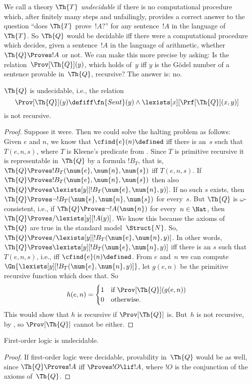 \documentclass[../../../include/open-logic-section]{subfiles}
\begin{document}

We call a theory $\Th{T}$ \emph{undecidable} if there is no
computational procedure which, after finitely many steps and
unfailingly, provides a correct answer to the question ``does $\Th{T}$
prove~$!A$?'' for any sentence~$!A$ in the language of~$\Th{T}$.  So
$\Th{Q}$ would be decidable iff there were a computational procedure
which decides, given a sentence~$!A$ in the language of arithmetic,
whether $\Th{Q} \Proves !A$ or not.  We can make this more precise by
asking: Is the relation~$\Prov[\Th{Q}](y)$, which holds of~$y$
iff $y$ is the G\"odel number of a sentence provable in~$\Th{Q}$,
recursive?  The answer is: no.

\begin{thm}
$\Th{Q}$ is undecidable, i.e., the relation
\[
\Prov[\Th{Q}](y) \defiff \fn{Sent}(y) \land
\lexists[x][\Prf[\Th{Q}](x, y)]
\]
is not recursive.
\end{thm}

\begin{proof}
Suppose it were.  Then we could solve the halting problem as follows:
Given $e$ and $n$, we know that $\cfind{e}(n) \defined$ iff there is
an~$s$ such that $T(e, n, s)$, where $T$ is Kleene's predicate from
.  Since $T$ is primitive recursive
it is representable in~$\Th{Q}$ by a formula $!B_T$, that is, $\Th{Q}
\Proves !B_T(\num{e}, \num{n}, \num{s})$ iff $T(e, n, s)$.  If $\Th{Q}
\Proves !B_T(\num{e}, \num{n}, \num{s})$ then also $ \Th{Q} \Proves
\lexists[y][!B_T(\num{e}, \num{n}, y)]$.  If no such $s$ exists, then
$\Th{Q} \Proves \lnot !B_T(\num{e}, \num{n}, \num{s})$ for
every~$s$.  But $\Th{Q}$ is $\omega$-consistent, i.e., if $\Th{Q}
\Proves \lnot !A(\num{n})$ for every~$n \in \Nat$, then $\Th{Q}
\Proves/ \lexists[y][!A(y)]$.  We know this because the axioms of
$\Th{Q}$ are true in the standard model~$\Struct{N}$.  So, $\Th{Q}
\Proves/ \lexists[y][!B_T(\num{e}, \num{n}, y)]$.  In other words,
$\Th{Q} \Proves \lexists[y][!B_T(\num{e}, \num{n}, y)]$ iff there is
an $s$ such that $T(e, n, s)$, i.e., iff $\cfind{e}(n) \defined$.
From $e$ and~$n$ we can compute $\Gn{\lexists[y][!B_T(\num{e},
    \num{n}, y)]}$, let $g(e, n)$ be the primitive recursive function
which does that.  So
\[
h(e, n) =
\begin{cases}
1 & \text{if $\Prov[\Th{Q}](g(e, n))$}\\
0 & \text{otherwise}.
\end{cases}
\]
This would show that $h$ is recursive if $\Prov[\Th{Q}]$ is. But~$h$
is not recursive, by , so
$\Prov[\Th{Q}]$ cannot be either.
\end{proof}

\begin{cor}
First-order logic is undecidable.
\end{cor}

\begin{proof}
If first-order logic were decidable, provability in~$\Th{Q}$ would be
as well, since $\Th{Q} \Proves !A$ iff $\Proves !O \lif !A$, where
$!O$ is the conjunction of the axioms of~$\Th{Q}$.
\end{proof}
\end{document}
